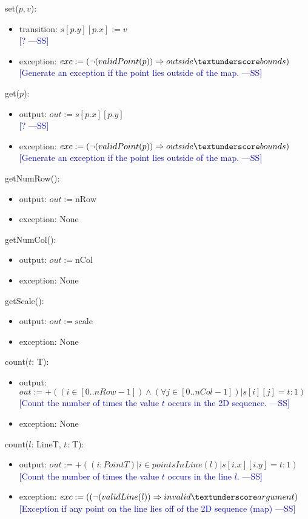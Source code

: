 \documentclass[12pt]{article}
\newcommand{\authornote}[3]{\textcolor{#1}{[#3 ---#2]}}
\newcommand{\authornote}[3]{}
\newcommand{\wss}[1]{\authornote{blue}{SS}{#1}}
\begin{document}
\noindent set($p, v$):
\begin{itemize}
\item transition: $s[p.y][p.x] := v$\\ \wss{?}
\item exception: $exc := (\neg(validPoint(p)) \Rightarrow outside\textunderscore bounds) $\\ \wss{Generate an exception if the point lies outside of the
    map.}
\end{itemize}

\noindent get($p$):
\begin{itemize}
\item output:  $out := s[p.x][p.y]$\\ \wss{?}
\item exception: $exc := (\neg(validPoint(p)) \Rightarrow outside\textunderscore bounds) $\\\wss{Generate an exception if the point lies outside of the
    map.}
\end{itemize}

\noindent getNumRow():
\begin{itemize}
\item output: $out := \mbox{nRow}$
\item exception: None
\end{itemize}

\noindent getNumCol():
\begin{itemize}
\item output: $out := \mbox{nCol}$
\item exception: None
\end{itemize}

\noindent getScale():
\begin{itemize}
\item output: $out := \mbox{scale}$
\item exception: None
\end{itemize}

\noindent count($t$: T):
\begin{itemize}
\item output: $out := +((i \in [0..nRow-1]) \land (\forall j \in [0..nCol-1])| s[i][j] =t:1)$\\ \wss{Count the number of times the value $t$ occurs in the 2D
    sequence.}
\item exception: None
\end{itemize}

\noindent count($l$: LineT, $t$: T):
\begin{itemize}
\item output: $out := +((i : PointT)| i \in pointsInLine(l)| s[i.x][i.y] =t:1)$\\ \wss{Count the number of times the value $t$ occurs in the line
    $l$.}
\item exception: $exc := ((\neg(validLine(l)) \Rightarrow invalid\textunderscore argument) $\\ \wss{Exception if any point on the line lies off of the 2D
    sequence (map)}
\end{itemize}
\end{document}

